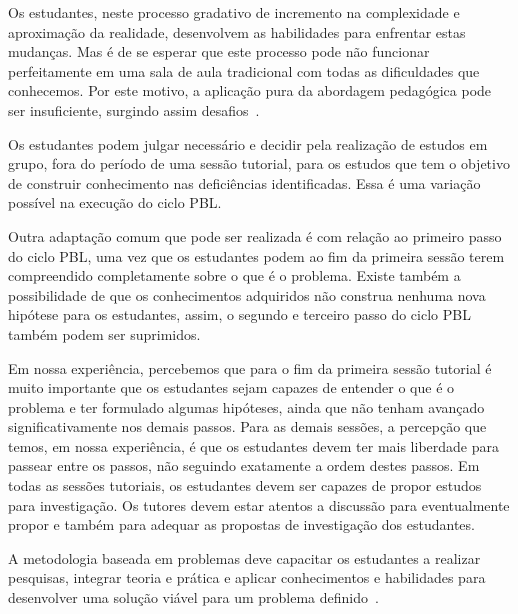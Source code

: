 Os estudantes, neste processo gradativo de incremento
na complexidade e aproximação da realidade, desenvolvem
as habilidades para enfrentar estas mudanças.
Mas é de se esperar que este processo pode não
funcionar perfeitamente em uma sala de aula
tradicional com todas as dificuldades que conhecemos.
Por este motivo, a aplicação pura da abordagem pedagógica
pode ser insuficiente, surgindo assim
desafios~\cite{fee2010teaching}.


Os estudantes podem julgar necessário e decidir
pela realização de estudos em grupo,
fora do período de uma sessão tutorial, para
os estudos que tem o objetivo de construir
conhecimento nas deficiências identificadas.
Essa é uma variação possível na execução
do ciclo \ac{PBL}.

Outra adaptação comum que pode ser realizada
é com relação ao primeiro passo do ciclo \ac{PBL},
uma vez que os estudantes podem ao fim
da primeira sessão terem compreendido
completamente sobre o que é o problema.
Existe também a possibilidade de que os
conhecimentos adquiridos não construa nenhuma
nova hipótese para os estudantes, assim, o segundo
e terceiro passo do ciclo \ac{PBL} também podem ser
suprimidos.

Em nossa experiência, percebemos que para o
fim da primeira sessão tutorial é muito importante
que os estudantes sejam capazes de entender
o que é o problema e ter formulado algumas
hipóteses, ainda que não tenham avançado
significativamente nos demais passos.
Para as demais sessões, a percepção
que temos, em nossa experiência, é
que os estudantes devem ter mais
liberdade para passear entre os passos,
não seguindo exatamente a ordem destes passos.
Em todas as sessões tutoriais, os estudantes
devem ser capazes de propor estudos
para investigação.
Os tutores devem
estar atentos a discussão para
eventualmente propor e também para
adequar as propostas de investigação
dos estudantes.

A metodologia baseada em problemas deve capacitar os estudantes a
realizar pesquisas, integrar teoria e prática e aplicar conhecimentos
e habilidades para desenvolver uma solução viável para
um problema definido~\cite{savery2015overview}.


